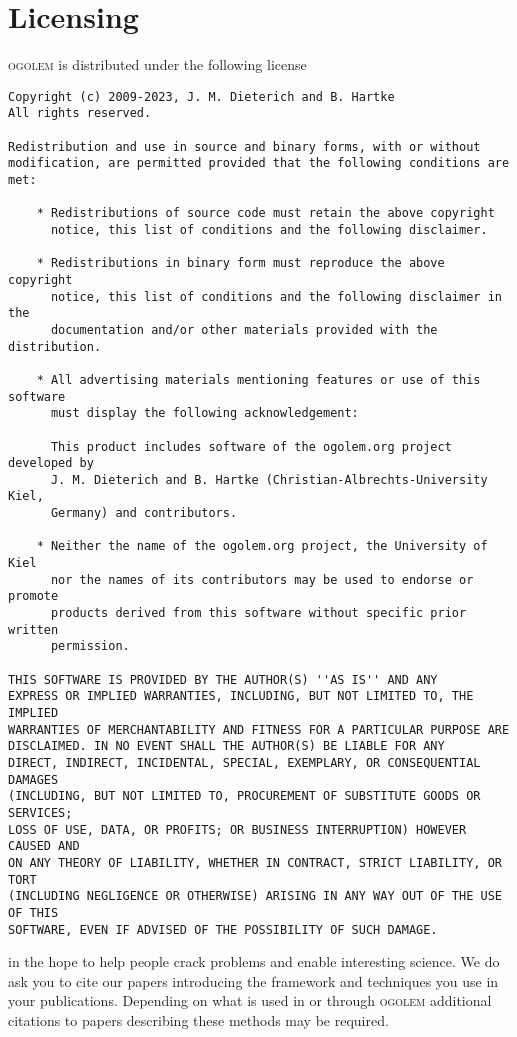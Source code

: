 \documentclass[a4paper,10pt]{scrbook}
\newcommand{\ogo}{\textsc{ogolem}}
\begin{document}
\section{Licensing}
\ogo{} is distributed under the following license
\begin{verbatim}
Copyright (c) 2009-2023, J. M. Dieterich and B. Hartke
All rights reserved.

Redistribution and use in source and binary forms, with or without
modification, are permitted provided that the following conditions are met:

    * Redistributions of source code must retain the above copyright
      notice, this list of conditions and the following disclaimer.

    * Redistributions in binary form must reproduce the above copyright
      notice, this list of conditions and the following disclaimer in the
      documentation and/or other materials provided with the distribution.

    * All advertising materials mentioning features or use of this software
      must display the following acknowledgement:

      This product includes software of the ogolem.org project developed by
      J. M. Dieterich and B. Hartke (Christian-Albrechts-University Kiel,
      Germany) and contributors.

    * Neither the name of the ogolem.org project, the University of Kiel
      nor the names of its contributors may be used to endorse or promote
      products derived from this software without specific prior written
      permission.

THIS SOFTWARE IS PROVIDED BY THE AUTHOR(S) ''AS IS'' AND ANY
EXPRESS OR IMPLIED WARRANTIES, INCLUDING, BUT NOT LIMITED TO, THE IMPLIED
WARRANTIES OF MERCHANTABILITY AND FITNESS FOR A PARTICULAR PURPOSE ARE
DISCLAIMED. IN NO EVENT SHALL THE AUTHOR(S) BE LIABLE FOR ANY
DIRECT, INDIRECT, INCIDENTAL, SPECIAL, EXEMPLARY, OR CONSEQUENTIAL DAMAGES
(INCLUDING, BUT NOT LIMITED TO, PROCUREMENT OF SUBSTITUTE GOODS OR SERVICES;
LOSS OF USE, DATA, OR PROFITS; OR BUSINESS INTERRUPTION) HOWEVER CAUSED AND
ON ANY THEORY OF LIABILITY, WHETHER IN CONTRACT, STRICT LIABILITY, OR TORT
(INCLUDING NEGLIGENCE OR OTHERWISE) ARISING IN ANY WAY OUT OF THE USE OF THIS
SOFTWARE, EVEN IF ADVISED OF THE POSSIBILITY OF SUCH DAMAGE.
\end{verbatim}
in the hope to help people crack problems and enable interesting science. We do 
ask you to cite our papers
introducing the framework and techniques you use in your
publications\cite{ogolem_first,lj_reparam,ogo_switches, 
kana_dimer,benchmark,water_pccp,gdm,water_small,cage1,cage2,earth}. Depending 
on what is used in or through \ogo{} additional citations to papers describing 
these methods may be required.
\end{document}
